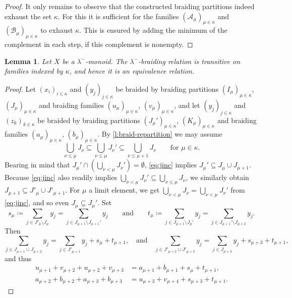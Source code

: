 \documentclass[a4paper,11pt,oneside]{amsart}
\newtheorem{lemma}[teor]{Lemma}
\theoremstyle{remark}
\newcommand{\cA}{\mathcal A}
\newcommand{\cB}{\mathcal B}
\begin{document}
\begin{proof}
    It only remains to observe that the constructed braiding partitions indeed exhaust the set $\kappa$.
    For this it is sufficient for the families $(\cA_\mu)_{\mu \in \kappa}$ and $(\cB_\mu)_{\mu \in \kappa}$ to exhaust $\kappa$.
    This is ensured by adding the minimum of the complement in each step, if this complement is nonempty.
\end{proof}

\begin{lemma} \label{l:braiding-transitive}
  Let $X$ be a $\lambda^-$-monoid.
  The $\lambda^-$-braiding relation is transitive on families indexed by $\kappa$, and hence it is an equivalence relation.
\end{lemma}

\begin{proof}
  Let $(x_i)_{i \in \kappa}$ and $(y_j)_{j \in \kappa}$ be braided by braiding partitions $(I_\mu)_{\mu \in \kappa}$, $(J_\mu)_{\mu \in \kappa}$ and braiding families $(u_\mu)_{\mu \in \kappa}$, $(v_\mu)_{\mu \in \kappa}$, and let $(y_j)_{j \in \kappa}$ and $(z_k)_{k \in \kappa}$ be braided by braiding partitions $(J_\mu')_{\mu \in \kappa}$, $(K_\mu)_{\mu \in \kappa}$ and braiding families $(a_\mu)_{\mu \in \kappa}$, $(b_\mu)_{\mu \in \kappa}$.
  By \cref{l:braid-repartition} we may assume
  \begin{equation} \label{eq:jinc}
    \bigcup_{\nu \le \mu} J_\nu \subseteq \bigcup_{\nu \le \mu} J_\nu' \subseteq \bigcup_{\nu \le \mu+1} J_{\nu} \qquad\text{for } \mu \in \kappa.
  \end{equation}
  Bearing in mind that $J_\mu' \cap (\bigcup_{\nu < \mu} J_\nu') = \emptyset$, \cref{eq:jinc} implies $J_\mu' \subseteq J_\mu \cup J_{\mu+1}$.
  Because \cref{eq:jinc} also readily implies $\bigcup_{\nu < \mu} J_\nu' \subseteq \bigcup_{\nu \le \mu} J_\nu$, we similarly obtain $J_{\mu+1} \subseteq J'_{\mu} \cup J'_{\mu+1}$.
  For $\mu$ a limit element, we get $\bigcup_{\nu < \mu} J_\nu  =\bigcup_{\nu < \mu} J_{\nu}'$ from \cref{eq:jinc}, and so even $J_\mu \subseteq J_\mu'$.
  Set
  \[
    s_\mu \coloneqq \sum_{j \in J'_\mu \setminus J_\mu} y_j = \sum_{j \in J_{\mu+1} \setminus J_{\mu+1}'} y_j \qquad\text{and}\qquad t_\mu \coloneqq \sum_{j \in J_{\mu+1} \setminus J_\mu'} y_j = \sum_{j \in J_{\mu+1}'\setminus J_{\mu+2}} y_j.
  \]
  Then
  \[
    \sum_{j \in J_{\mu+1} \cup J_{\mu + 2}} y_j = \sum_{j \in J'_{\mu+1}} y_j + s_\mu + t_{\mu+1}, \quad\text{and}\quad
    \sum_{j \in J'_{\mu+2} \cup J'_{\mu + 3}} y_j = \sum_{j \in J_{\mu + 3}} y_j + s_{\mu+3} + t_{\mu+1},
  \]
  and thus
  \begin{align}
    u_{\mu+1}+v_{\mu+2}+u_{\mu+2}+v_{\mu+3} &= a_{\mu+1} + b_{\mu+1} + s_\mu + t_{\mu + 1}, \label{eq:subs1} \\
    a_{\mu+2} + b_{\mu+2} + a_{\mu+3} + b_{\mu + 3} &= u_{\mu+3} + v_{\mu+4} + s_{\mu+3} + t_{\mu+1} \label{eq:subs2}.
  \end{align}


\end{proof}
\end{document}
